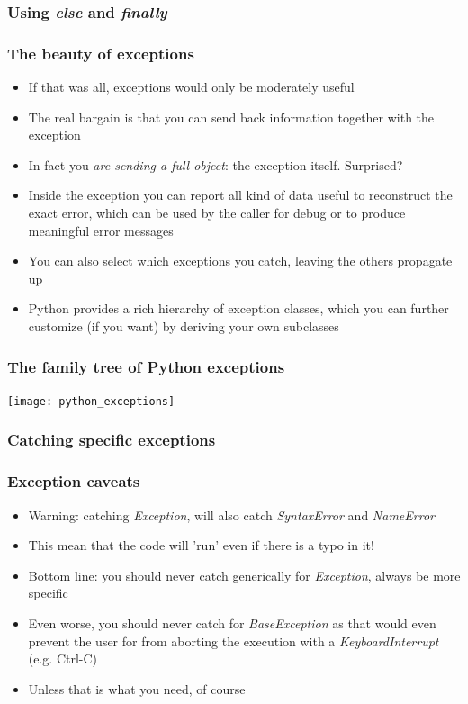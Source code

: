 \documentclass[9pt]{beamer}
\begin{document}
\begin{frame}
  \frametitle{Using \emph{else} and \emph{finally}}
  
\end{frame}


\begin{frame}
  \frametitle{The beauty of exceptions}
  \begin{itemize}
    \item If that was all, exceptions would only be moderately useful
    \item The real bargain is that you can send back information together with the exception
    \item In fact you \textit{are sending a full object}: the exception itself. Surprised?
    \item Inside the exception you can report all kind of data useful to reconstruct the exact error,
          which can be used by the caller for debug or to produce meaningful error messages
    \item You can also select which exceptions you catch, leaving the others propagate up
    \item Python provides a rich hierarchy of exception classes, which you can further customize
          (if you want) by deriving your own subclasses
  \end{itemize}
\end{frame}


\begin{frame}
  \frametitle{The family tree of Python exceptions}
  \centering\texttt{[image: python\_exceptions]}
\end{frame}


\begin{frame}
  \frametitle{Catching specific exceptions}
  
\end{frame}


\begin{frame}
  \frametitle{Exception caveats}
  \begin{itemize}
    \item Warning: catching \emph{Exception}, will also catch \emph{SyntaxError}
          and \emph{NameError}
    \medskip
    \item This mean that the code will 'run' even if there is a typo in it!
    \medskip
    \item Bottom line: \alert{you should never catch generically for \emph{Exception}},
          always be more specific
    \medskip
    \item Even worse, you should never catch for \emph{BaseException} as
          that would even prevent the user for from aborting the execution with a
          \emph{KeyboardInterrupt} (e.g. Ctrl-C)
    \medskip
    \item Unless that is what you need, of course
  \end{itemize}
\end{frame}
\end{document}
